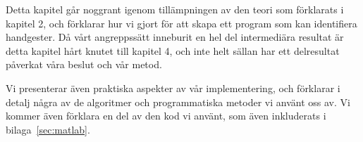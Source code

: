\documentclass[../rapport_MVEX01-11-05]{subfiles}
\begin{document}
Detta kapitel går noggrant igenom tillämpningen av den teori som förklarats
i kapitel 2, och förklarar hur vi gjort för att skapa ett program som kan
identifiera handgester. Då vårt angreppssätt inneburit en hel del intermediära
resultat är detta kapitel hårt knutet till kapitel 4, och inte helt sällan
har ett delresultat påverkat våra beslut och vår metod.

Vi presenterar även praktiska aspekter av vår implementering, och förklarar
i detalj några av de algoritmer och programmatiska metoder vi använt oss av.
Vi kommer även förklara en del av den kod vi använt, som även inkluderats i
bilaga~\ref{sec:matlab}.
\end{document}
